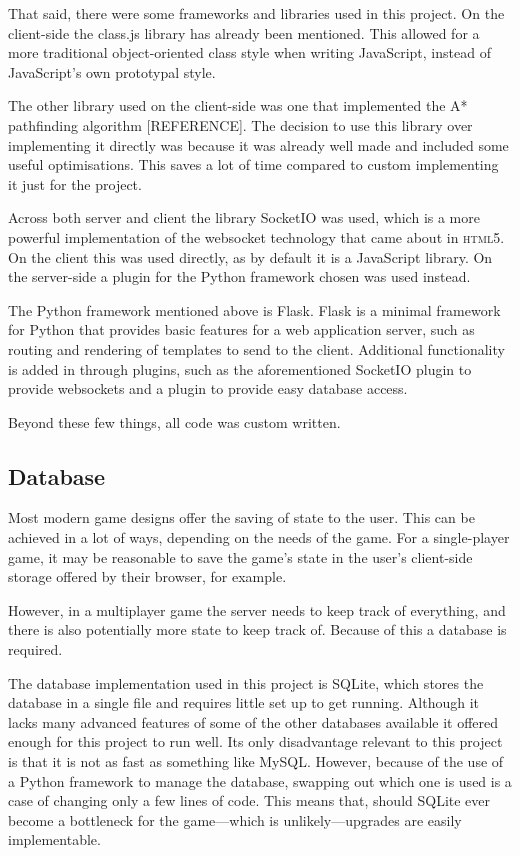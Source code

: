That said, there were some frameworks and libraries used in this project. On the client-side the class.js library has already been mentioned. This allowed for a more traditional object-oriented class style when writing JavaScript, instead of JavaScript's own prototypal style.

The other library used on the client-side was one that implemented the A* pathfinding algorithm [REFERENCE]. The decision to use this library over implementing it directly was because it was already well made and included some useful optimisations. This saves a lot of time compared to custom implementing it just for the project.

Across both server and client the library SocketIO was used, which is a more powerful implementation of the websocket technology that came about in \textsc{html5}. On the client this was used directly, as by default it is a JavaScript library. On the server-side a plugin for the Python framework chosen was used instead.

The Python framework mentioned above is Flask. Flask is a minimal framework for Python that provides basic features for a web application server, such as routing and rendering of templates to send to the client. Additional functionality is added in through plugins, such as the aforementioned SocketIO plugin to provide websockets and a plugin to provide easy database access.

Beyond these few things, all code was custom written.

\subsection{Database}
Most modern game designs offer the saving of state to the user. This can be achieved in a lot of ways, depending on the needs of the game. For a single-player game, it may be reasonable to save the game's state in the user's client-side storage offered by their browser, for example.

However, in a multiplayer game the server needs to keep track of everything, and there is also potentially more state to keep track of. Because of this a database is required.

The database implementation used in this project is SQLite, which stores the database in a single file and requires little set up to get running. Although it lacks many advanced features of some of the other databases available it offered enough for this project to run well. Its only disadvantage relevant to this project is that it is not as fast as something like MySQL. However, because of the use of a Python framework to manage the database, swapping out which one is used is a case of changing only a few lines of code. This means that, should SQLite ever become a bottleneck for the game---which is unlikely---upgrades are easily implementable.

